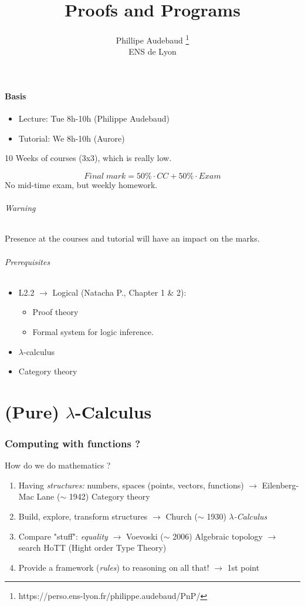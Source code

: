 \documentclass{article}
\title{Proofs and Programs}
\author{Phillipe Audebaud \footnote{https://perso.ens-lyon.fr/philippe.audebaud/PnP/}\\
\small ENS de Lyon}
\date{}
\begin{document}
\maketitle
\tableofcontents
\newpage

\subsection*{Basis}
\begin{itemize}
\item Lecture: Tue 8h-10h (Philippe Audebaud)
\item Tutorial: We 8h-10h (Aurore)
\end{itemize}
10 Weeks of courses (3x3), which is really low.

\[Final\;mark = 50\% \cdot CC + 50\% \cdot Exam\]
No mid-time exam, but weekly homework.

\paragraph{Warning} Presence at the courses and tutorial will have an impact on the marks.

\paragraph{Prerequisites}
\begin{itemize}
\item L2.2 $\to$ Logical (Natacha P., Chapter 1 \& 2): 
\begin{itemize}
\item Proof theory
\item Formal system for logic inference.
\end{itemize}
\item $\lambda$-calculus
\item Category theory
\end{itemize}

\setcounter{section}{0}
\part{(Pure) $\lambda$-Calculus}
\section{Computing with functions ?}
How do we do mathematics ?
\begin{enumerate}[A]
\item Having \emph{structures:} numbers, spaces (points, vectors, functions) $\to$ Eilenberg-Mac Lane ($\sim$ 1942) Category theory
\item Build, explore, transform structures $\to$ Church ($\sim$ 1930) \emph{$\lambda$-Calculus}
\item Compare "stuff": \emph{equality} $\to$ Voevoski ($\sim$ 2006) Algebraic topology $\to$ search HoTT (Hight order Type Theory)
\item Provide a framework (\emph{rules}) to reasoning on all that! $\to$ 1st point
\end{enumerate}
\end{document}
